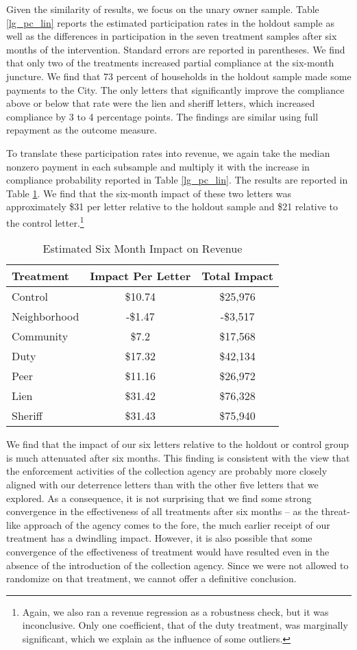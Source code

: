\documentclass[12pt]{article}
\begin{document}
Given the similarity of results, we focus on the unary owner sample.  Table \ref{lg_pc_lin}
reports the estimated participation rates in the holdout sample as
well as the differences in participation in the seven treatment
samples after six months of the intervention. Standard errors
are reported in parentheses. We find that only two of the treatments
increased partial compliance at the six-month juncture.  We find that 73
percent of households in the holdout sample made some payments to the
City. The only letters that significantly improve the compliance above or below
that rate were the lien and sheriff letters, which increased
compliance by 3 to 4 percentage points. The findings are similar using
full repayment as the outcome measure.

To translate these participation rates into revenue, we again take the
median nonzero payment in each subsample and multiply it with
the increase in compliance probability reported in Table
\ref{lg_pc_lin}.  The results are reported in Table \ref{lg_rev}. We
find that the six-month impact of these two letters was approximately
\$31 per letter relative to the holdout sample and \$21 relative to
the control letter.\footnote{Again, we also ran a revenue regression as a 
robustness check, but it was inconclusive. Only one 
coefficient, that of the duty treatment, was marginally significant, which we
explain as the influence of some outliers.}

\begin{table}[htbp]
\caption{Estimated Six Month Impact on Revenue} \label{lg_rev}
\bigskip
\centering
\begin{tabular}{lcc}
  \hline
Treatment & Impact Per Letter & Total Impact \\ 
  \hline
Control & \$10.74 & \$25,976 \\ 
  Neighborhood & -\$1.47 & -\$3,517 \\ 
  Community & \$7.2 & \$17,568 \\ 
  Duty & \$17.32 & \$42,134 \\ 
  Peer & \$11.16 & \$26,972 \\ 
  Lien & \$31.42 & \$76,328 \\ 
  Sheriff & \$31.43 & \$75,940 \\ 
   \hline
\end{tabular}
\end{table}

We find that the impact of our six letters relative to the holdout or
control group is much attenuated after six months. This finding is
consistent with the view that the enforcement activities of the
collection agency are probably more closely aligned with our
deterrence letters than with the other five letters that we
explored. As a consequence, it is not surprising that we find some
strong convergence in the effectiveness of all treatments after six
months -- as the threat-like approach of the agency comes to the fore,
the much earlier receipt of our treatment has a dwindling impact.
However, it is also possible that some convergence of the
effectiveness of treatment would have resulted even in the absence of the
introduction of the collection agency. Since we were not allowed to
randomize on that treatment, we cannot offer a definitive conclusion.
\end{document}
